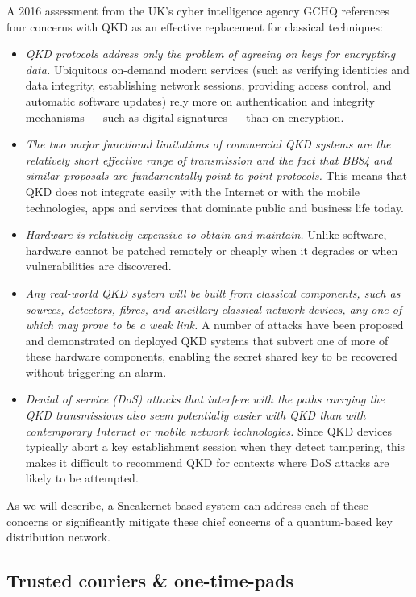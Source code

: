 \documentclass[twocolumn, aps, rmp, amsmath, amssymb, nofootinbib, superscriptaddress, longbibliography, floatfix, table-of-contents, eqsecnum]{revtex4-2}
\begin{document}
A 2016 assessment from the UK's cyber intelligence agency GCHQ references four concerns with QKD as an effective replacement for classical techniques:
\begin{itemize}
\item \textit{QKD protocols address only the problem of agreeing on keys for encrypting data.} Ubiquitous on-demand modern services (such as verifying identities and data integrity, establishing network sessions, providing access control, and automatic software updates) rely more on authentication and integrity mechanisms — such as digital signatures — than on encryption.
\item \textit{The two major functional limitations of commercial QKD systems are the relatively short effective range of transmission and the fact that BB84 and similar proposals are fundamentally point-to-point protocols.} This means that QKD does not integrate easily with the Internet or with the mobile technologies, apps and services that dominate public and business life today.
\item \textit{Hardware is relatively expensive to obtain and maintain.} Unlike software, hardware cannot be patched remotely or cheaply when it degrades or when vulnerabilities are discovered.
\item \textit{Any real-world QKD system will be built from classical components, such as sources, detectors, fibres, and ancillary classical network devices, any one of which may prove to be a weak link.} A number of attacks have been proposed and demonstrated on deployed QKD systems that subvert one of more of these hardware components, enabling the secret shared key to be recovered without triggering an alarm.
\item \textit{Denial of service (DoS) attacks that interfere with the paths carrying the QKD transmissions also seem potentially easier with QKD than with contemporary Internet or mobile network technologies.} Since QKD devices typically abort a key establishment session when they detect tampering, this makes it difficult to recommend QKD for contexts where DoS attacks are likely to be attempted.
\end{itemize}

As we will describe, a Sneakernet based system can address each of these concerns or significantly mitigate these chief concerns of a quantum-based key distribution network.

\subsection{Trusted couriers \& one-time-pads}
\end{document}
